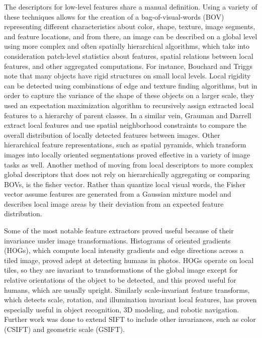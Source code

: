 The descriptors for low-level features share a manual definition. Using a variety of these techniques allows for the creation of a bag-of-visual-words (BOV) representing different characteristics about color, shape, texture, image segments, and feature locations, and from there, an image can be described on a global level using more complex and often spatially hierarchical algorithms, which take into consideration patch-level statistics about features, spatial relations between local features, and other aggregated computations. For instance, Bouchard and Triggs note that many objects have rigid structures on small local levels. Local rigidity can be detected using combinations of edge and texture finding algorithms, but in order to capture the variance of the shape of these objects on a larger scale, they used an expectation maximization algorithm to recursively assign extracted local features to a hierarchy of parent classes.\cite{bouchard2005hierarchical} In a similar vein, Grauman and Darrell extract local features and use spatial neighborhood constraints to compare the overall distribution of locally detected features between images.\cite{grauman2005efficient} Other hierarchical feature representations, such as spatial pyramids, which transform images into locally oriented segmentations proved effective in a variety of image tasks as well\cite{yang2009linear}\cite{girshick2014rich}\cite{lazebnik2006beyond}. Another method of moving from local descriptors to more complex global descriptors that does not rely on hierarchically aggregating or comparing BOVs, is the fisher vector. Rather than quantize local visual words, the Fisher vector assume features are generated from a Gaussian mixture model and describes local image areas by their deviation from an expected feature distribution.\cite{sanchez2013image}

Some of the most notable feature extractors proved useful because of their invariance under image transformations. Histograms of oriented gradients (HOGs), which compute local intensity gradients and edge directions across a tiled image, proved adept at detecting humans in photos.\cite{dalal2005histograms} HOGs operate on local tiles, so they are invariant to transformations of the global image except for relative orientations of the object to be detected, and this proved useful for humans, which are usually upright. Similarly scale-invariant feature transforms, which detects scale, rotation, and illumination invariant local features, has proven especially useful in object recognition, 3D modeling, and robotic navigation.\cite{lowe1999object} Further work was done to extend SIFT to include other invariances, such as color (CSIFT) and geometric scale (GSIFT).\cite{abdel2006csift}\cite{lodha2005gsift}

